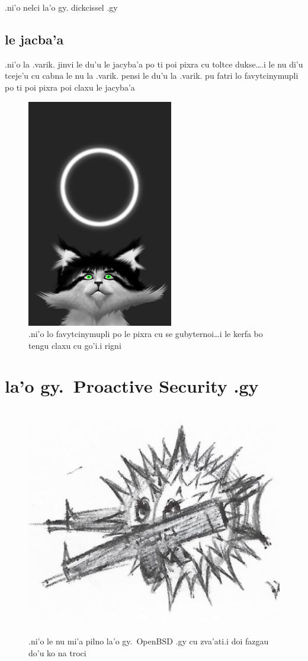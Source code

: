 \documentclass{report}
\begin{document}
.ni'o nelci la'o gy. dickcissel .gy

\section{le jacba'a}
.ni'o la .varik. jinvi le du'u le jacyba'a po ti poi pixra cu toltce dukse\ldots\@ .i le nu di'u tceje'u cu cabna le nu la .varik. pensi le du'u la .varik. pu fatri lo favytcinymupli po ti poi pixra poi claxu le jacyba'a

\begin{figure}[ht]
	\centering
	\includegraphics[height=10cm]{20200414042645-03/20200414042645-03-uw.png}
	\caption[center]{.ni'o lo favytcinymupli po le pixra cu se gubyternoi\ldots i le kerfa bo tengu claxu cu go'i\@  .i rigni}
\end{figure}
\chapter{la'o gy.\ Proactive Security .gy}
\begin{figure}[ht]
	\centering
	\includegraphics[height=10cm]{proactivesecurity/proactivesecurity.png}
	\caption[center]{.ni'o le nu mi'a pilno la'o gy.\ OpenBSD .gy cu zva'ati\@  .i doi fazgau do'u ko na troci}
\end{figure}
\end{document}
